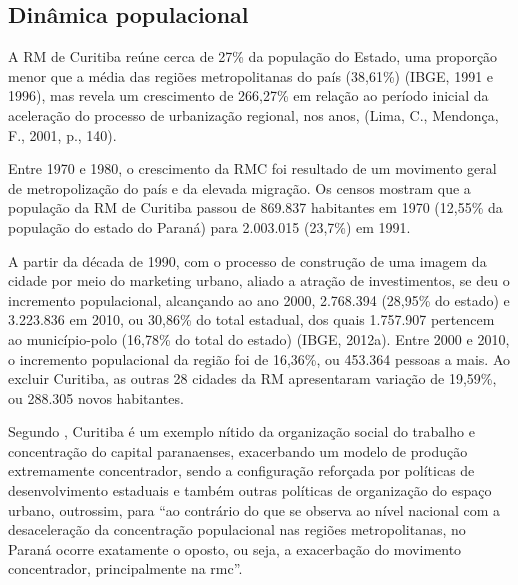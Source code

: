 	\subsection{Dinâmica populacional}
	
	A RM de Curitiba reúne cerca de 27\% da população do Estado,  uma proporção menor que a média das regiões metropolitanas do país (38,61\%) (IBGE, 1991 e 1996), mas revela um  crescimento de 266,27\% em relação ao período inicial da aceleração do processo de urbanização regional, nos anos, (Lima, C., Mendonça, F., 2001, p., 140).
	
	Entre 1970 e 1980, o crescimento da RMC foi resultado de um movimento geral de metropolização do país e da elevada migração. Os censos mostram que a população da RM de Curitiba passou de 869.837 habitantes em 1970 (12,55\% da população do estado do Paraná) para 2.003.015 (23,7\%) em 1991.
	
	A partir da década de 1990, com o processo de construção de uma imagem da cidade por meio do marketing urbano, aliado a atração de investimentos, se deu o incremento populacional, alcançando ao ano 2000, 2.768.394 (28,95\% do estado) e 3.223.836 em 2010, ou 30,86\% do total estadual, dos quais 1.757.907 pertencem ao município-polo (16,78\% do total do estado) (IBGE, 2012a). Entre 2000 e 2010, o incremento populacional da região foi de 16,36\%, ou 453.364 pessoas a mais. Ao excluir Curitiba, as outras 28 cidades da RM apresentaram variação de 19,59\%, ou 288.305 novos habitantes.
	
	Segundo , Curitiba é um exemplo nítido da organização social do trabalho e concentração do capital paranaenses, exacerbando um modelo de produção extremamente concentrador, sendo a configuração reforçada por políticas de desenvolvimento estaduais e também outras políticas de organização do espaço urbano, outrossim, para  ``ao contrário do que se observa ao nível nacional com a desaceleração da concentração populacional nas regiões metropolitanas, no Paraná ocorre exatamente o oposto, ou seja, a exacerbação do movimento concentrador, principalmente na \glsdesc{rmc}''.
	
